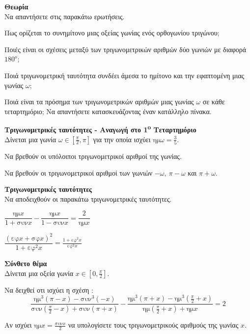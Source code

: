 \documentclass[ektypwsh]{diag-xelatex}
\newcommand{\tss}[1]{\textsuperscript{#1}}
\begin{document}
\begin{thema}
\item \textbf{Θεωρία}\\
Να απαντήσετε στις παρακάτω ερωτήσεις.
\begin{rlist}
\item Πως ορίζεται το συνημίτονο μιας οξείας γωνίας ενός ορθογωνίου τριγώνου;
\item Ποιές είναι οι σχέσεις μεταξύ των τριγωνομετρικών αριθμών δύο γωνιών με διαφορά $ 180^o $;
\item Ποιά τριγωνομετρική ταυτότητα συνδέει άμεσα το ημίτονο και την εφαπτομένη μιας γωνίας $ \omega $;
\item Ποιά είναι τα πρόσημα των τριγωνομετρικών αριθμών μιας γωνίας $ \omega $ σε κάθε τεταρτημόριο; Να απαντήσετε κατασκευάζοντας έναν κατάλληλο πίνακα.
\end{rlist}
\item \textbf{Τριγωνομετρικές ταυτότητες - Αναγωγή στο 1\tss{o} Τεταρτημόριο}\\
Δίνεται μια γωνία $ \omega\in\left[\frac{\pi}{2},\pi\right]  $ για την οποία ισχύει $ \textrm{ημ}{\omega}=\frac{3}{5} $. 
\begin{rlist}
\item Να βρεθούν οι υπόλοιποι τριγωνομετρικοί αριθμοί της γωνίας.
\item Να βρεθούν οι τριγωνομετρικοί αριθμοί των γωνιών $ -\omega,\ \pi-\omega $ και $ \pi+\omega $.
\end{rlist}
\item \textbf{Τριγωνομετρικές ταυτότητες}\\
Να αποδειχθούν οι παρακάτω τριγωνομετρικές ταυτότητες.
\begin{multicols}{2}
\begin{rlist}
\item $ \dfrac{\textrm{ημ}{x}}{1+\textrm{συν}{x}}-\dfrac{\textrm{ημ}{x}}{1-\textrm{συν}{x}}=\dfrac{2}{\textrm{ημ}{x}} $
\item $ \dfrac{\left( \textrm{εφ}{x}+\textrm{σφ}{x}\right)^2 }{1+\textrm{εφ}^2{x}}=\frac{1+\textrm{εφ}^2{x}}{\textrm{εφ}^2{x}} $
\end{rlist}
\end{multicols}
\item \textbf{Σύνθετο θέμα}\\
Δίνεται μια οξεία γωνία $ x\in\left[0,\frac{\pi}{2}\right]  $.
\begin{rlist}
\item Να δειχθεί οτι ισχύει η σχέση :
\[ \dfrac{\textrm{ημ}^3{\left( \pi-x\right) }-\textrm{συν}^3{\left( -x\right) }}{\textrm{συν}{\left( \frac{\pi}{2}-x\right) }+\textrm{συν}{\left( \pi+x\right) }}-\dfrac{\textrm{ημ}^3{\left( \pi+x\right) }-\textrm{ημ}^3{\left(\frac{\pi}{2}+x\right) }}{\textrm{ημ}{\left( \frac{\pi}{2}+x\right) }+\textrm{ημ}{x}}=2 \]
\item Αν ισχύει $ \textrm{ημ}{x}=\frac{\textrm{συν}{x}}{2} $ να υπολογίσετε τους τριγωνομετρικούς αριθμούς της γωνίας $ x $.
\end{rlist}
\end{thema}
\kaliepityxia
\end{document}
